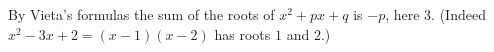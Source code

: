 By Vieta's formulas the sum of the roots of $x^2+px+q$ is $-p$, here $\boxed{3}$. (Indeed $x^2-3x+2=(x-1)(x-2)$ has roots $1$ and $2$.)

